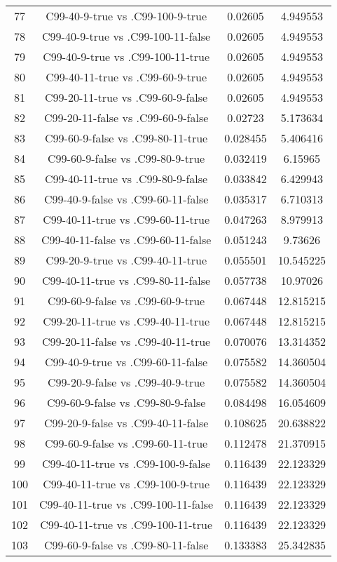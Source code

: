 \documentclass[a4paper,10pt]{article}
\begin{document}
\begin{landscape}
\begin{table}[!htp]
\begin{tabular}{cccc}
77&C99-40-9-true vs .C99-100-9-true&0.02605&4.949553\\
78&C99-40-9-true vs .C99-100-11-false&0.02605&4.949553\\
79&C99-40-9-true vs .C99-100-11-true&0.02605&4.949553\\
80&C99-40-11-true vs .C99-60-9-true&0.02605&4.949553\\
81&C99-20-11-true vs .C99-60-9-false&0.02605&4.949553\\
82&C99-20-11-false vs .C99-60-9-false&0.02723&5.173634\\
83&C99-60-9-false vs .C99-80-11-true&0.028455&5.406416\\
84&C99-60-9-false vs .C99-80-9-true&0.032419&6.15965\\
85&C99-40-11-true vs .C99-80-9-false&0.033842&6.429943\\
86&C99-40-9-false vs .C99-60-11-false&0.035317&6.710313\\
87&C99-40-11-true vs .C99-60-11-true&0.047263&8.979913\\
88&C99-40-11-false vs .C99-60-11-false&0.051243&9.73626\\
89&C99-20-9-true vs .C99-40-11-true&0.055501&10.545225\\
90&C99-40-11-true vs .C99-80-11-false&0.057738&10.97026\\
91&C99-60-9-false vs .C99-60-9-true&0.067448&12.815215\\
92&C99-20-11-true vs .C99-40-11-true&0.067448&12.815215\\
93&C99-20-11-false vs .C99-40-11-true&0.070076&13.314352\\
94&C99-40-9-true vs .C99-60-11-false&0.075582&14.360504\\
95&C99-20-9-false vs .C99-40-9-true&0.075582&14.360504\\
96&C99-60-9-false vs .C99-80-9-false&0.084498&16.054609\\
97&C99-20-9-false vs .C99-40-11-false&0.108625&20.638822\\
98&C99-60-9-false vs .C99-60-11-true&0.112478&21.370915\\
99&C99-40-11-true vs .C99-100-9-false&0.116439&22.123329\\
100&C99-40-11-true vs .C99-100-9-true&0.116439&22.123329\\
101&C99-40-11-true vs .C99-100-11-false&0.116439&22.123329\\
102&C99-40-11-true vs .C99-100-11-true&0.116439&22.123329\\
103&C99-60-9-false vs .C99-80-11-false&0.133383&25.342835\\

\end{tabular}
\end{table}
\end{landscape}
\end{document}
